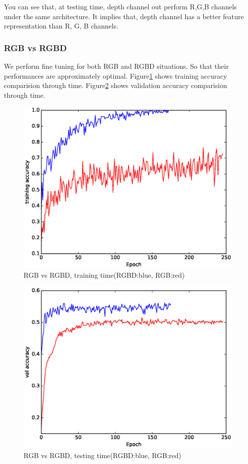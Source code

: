 \documentclass[10pt,twocolumn,letterpaper]{article}
\begin{document}
You can see that, at testing time, depth channel out perform R,G,B channels 
under the same architecture.
It implies that, depth channel has a better feature representation than R, G, B channels.

\subsubsection{RGB vs RGBD}
We perform fine tuning for both RGB and RGBD situations.
 So that their performances are approximately optimal.
Figure\ref{fig:mixtrain} shows training accuracy comparision through time. 
Figure\ref{fig:mixtest} shows validation accuracy comparision through time. 
\begin{figure}
\includegraphics[width=\linewidth]{../presentation/together_train.eps}
\caption{RGB vs RGBD, training time(RGBD:blue, RGB:red)}
\label{fig:mixtrain}
\end{figure}
\begin{figure}
\includegraphics[width=\linewidth]{../presentation/together_test.eps}
\caption{RGB vs RGBD, testing time(RGBD:blue, RGB:red)}
\label{fig:mixtest}
\end{figure}
\end{document}
